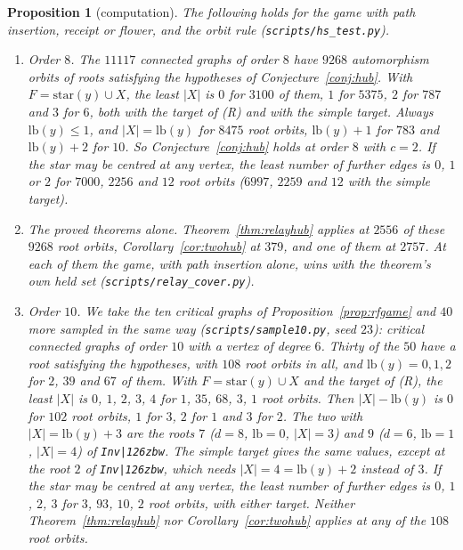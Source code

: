 \documentclass[11pt]{amsart}
\newtheorem{proposition}[theorem]{Proposition}
\theoremstyle{definition}
\begin{document}
\begin{proposition}[computation]\label{prop:hubtest}
The following holds for the game with path insertion, receipt or flower, and the orbit rule
(\texttt{scripts/hs\_test.py}).
\begin{enumerate}[label=(\alph*)]
\item \emph{Order $8$.} The $11117$ connected graphs of order $8$ have $9268$ automorphism orbits
of roots satisfying the hypotheses of Conjecture~\ref{conj:hub}. With $F=\mathrm{star}(y)\cup X$,
the least $|X|$ is $0$ for $3100$ of them, $1$ for $5375$, $2$ for $787$ and $3$ for $6$, both
with the target of (R) and with the simple target. Always $\mathrm{lb}(y)\le1$, and
$|X|=\mathrm{lb}(y)$ for $8475$ root orbits, $\mathrm{lb}(y)+1$ for $783$ and $\mathrm{lb}(y)+2$
for $10$. So Conjecture~\ref{conj:hub} holds at order $8$ with $c=2$. If the star may be centred at any
vertex, the least number of further edges is $0$, $1$ or $2$ for $7000$, $2256$ and $12$ root
orbits ($6997$, $2259$ and $12$ with the simple target).
\item \emph{The proved theorems alone.} Theorem~\ref{thm:relayhub} applies at $2556$ of these
$9268$ root orbits, Corollary~\ref{cor:twohub} at $379$, and one of them at $2757$. At each of
them the game, with path insertion alone, wins with the theorem's own held set
(\texttt{scripts/relay\_cover.py}).
\item \emph{Order $10$.} We take the ten critical graphs of Proposition~\ref{prop:rfgame} and $40$
more sampled in the same way (\texttt{scripts/sample10.py}, seed $23$): critical connected graphs
of order $10$ with a vertex of degree $6$. Thirty of the $50$ have a root satisfying the
hypotheses, with $108$ root orbits in all, and $\mathrm{lb}(y)=0,1,2$ for $2$, $39$ and $67$ of
them. With $F=\mathrm{star}(y)\cup X$ and the target of (R), the least $|X|$ is $0$, $1$, $2$, $3$,
$4$ for $1$, $35$, $68$, $3$, $1$ root orbits. Then $|X|-\mathrm{lb}(y)$ is $0$ for $102$ root
orbits, $1$ for $3$, $2$ for $1$ and $3$ for $2$. The two with $|X|=\mathrm{lb}(y)+3$ are the roots
$7$ ($d=8$, $\mathrm{lb}=0$, $|X|=3$) and $9$ ($d=6$, $\mathrm{lb}=1$, $|X|=4$) of
\texttt{Inv|\char126zbw}. The simple target gives the same values, except at the root $2$
of \texttt{Inv|\char126zbw}, which needs $|X|=4=\mathrm{lb}(y)+2$ instead of $3$. If the star
may be centred at any vertex, the least number of further edges is $0$, $1$, $2$, $3$ for $3$,
$93$, $10$, $2$ root orbits, with either target. Neither Theorem~\ref{thm:relayhub} nor
Corollary~\ref{cor:twohub} applies at any of the $108$ root orbits.
\end{enumerate}
\end{proposition}
\end{document}
